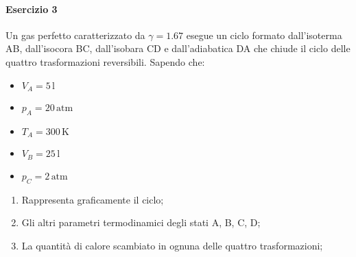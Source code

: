 \paragraph{Esercizio 3}
Un gas perfetto caratterizzato da $\gamma = 1.67$ esegue un ciclo formato dall'isoterma AB, 
dall'isocora BC, dall'isobara CD e dall'adiabatica DA che chiude il ciclo delle quattro trasformazioni
reversibili. Sapendo che:
\begin{multicols}{2}
  \begin{itemize}
    \item $V_A = 5\,\text{l}$
    \item $p_A = 20\,\text{atm}$
    \item $T_A = 300\,\text{K}$
    \item $V_B = 25\,\text{l}$
    \item $p_C = 2\,\text{atm}$
  \end{itemize}
\end{multicols}
\begin{enumerate}[label=$\alph*)$]
  \item Rappresenta graficamente il ciclo;
  \item Gli altri parametri termodinamici degli stati A, B, C, D;
  \item La quantità di calore scambiato in ognuna delle quattro trasformazioni;
\end{enumerate}
\divisor

